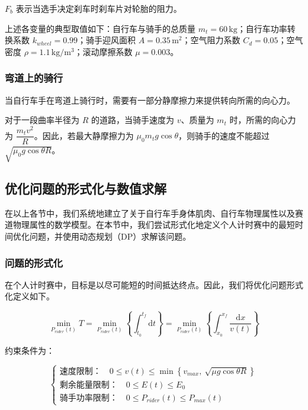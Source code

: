\documentclass[11pt,a4paper]{ctexart}
\begin{document}
$F_b$ 表示当选手决定刹车时刹车片对轮胎的阻力。

上述各变量的典型取值如下：自行车与骑手的总质量 $m_t=60\,\mathrm{kg}$；自行车功率转换系数 $k_{wheel}=0.99$；骑手迎风面积 $A=0.35\,\mathrm{m^2}$；空气阻力系数 $C_d=0.05$；空气密度 $\rho=1.1\,\mathrm{kg/m^3}$；滚动摩擦系数 $\mu=0.003$。

\subsubsection{弯道上的骑行}

当自行车手在弯道上骑行时，需要有一部分静摩擦力来提供转向所需的向心力。

对于一段曲率半径为 $R$ 的道路，当骑手速度为 $v$、质量为 $m_t$ 时，所需的向心力为 $\dfrac{m_t v^2}{R}$。因此，若最大静摩擦力为 $\mu_0 m_t g\cos\theta$，则骑手的速度不能超过 $\sqrt{\mu_0 g\cos\theta R}$。

\subsection{优化问题的形式化与数值求解}

在以上各节中，我们系统地建立了关于自行车手身体肌肉、自行车物理属性以及赛道物理属性的数学模型。在本节中，我们尝试形式化地定义个人计时赛中的最短时间优化问题，并使用动态规划（DP）求解该问题。

\subsubsection{问题的形式化}

在个人计时赛中，目标是以尽可能短的时间抵达终点。因此，我们将优化问题形式化定义如下。

\begin{equation}
\min_{P_{rider}(t)}T=\min_{P_{rider}(t)}\left\{\int_{t_0}^{t_f}\mathrm{d}t\right\}=\min_{P_{rider}(t)}\left\{\int_{x_0}^{x_f}\frac{\mathrm{d}x}{v(t)}\right\}
\end{equation}

约束条件为：

\begin{equation}
\begin{cases}
\text{速度限制：}\quad 0\leqslant v(t)\leqslant \min\left\{v_{max},\ \sqrt{\mu g\cos\theta R}\right\}\\[0.4em]
\text{剩余能量限制：}\quad 0\leqslant E(t)\leqslant E_0\\[0.4em]
\text{骑手功率限制：}\quad 0\leqslant P_{rider}(t)\leqslant P_{max}(t)
\end{cases}
\end{equation}
\end{document}
